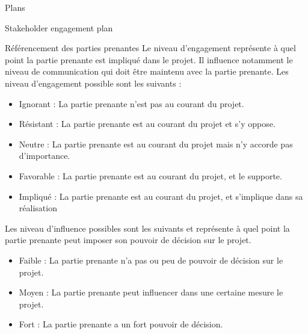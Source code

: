 \documentclass[]{article}
\begin{document}
\begin{section}{Plans}
\begin{subsection}{Stakeholder engagement plan}
\begin{subsubsection}{Référencement des parties prenantes}
         Le niveau d'engagement représente à quel point la partie prenante est impliqué dans le projet. Il influence notamment le niveau de communication qui doit être maintenu avec la partie prenante.
         Les niveau d'engagement possible sont les suivants :
         \begin{itemize}
             \item Ignorant : La partie prenante n'est pas au courant du projet.
             \item Résistant : La partie prenante est au courant du projet et s'y oppose.
             \item Neutre : La partie prenante est au courant du projet mais n'y accorde pas d'importance.
             \item Favorable : La partie prenante est au courant du projet, et le supporte.
             \item Impliqué : La partie prenante est au courant du projet, et s'implique dans sa réalisation
         \end{itemize}

         Les niveau d'influence possibles sont les suivants et représente à quel point la partie prenante peut imposer son pouvoir de décision sur le projet.
         \begin{itemize}
             \item Faible : La partie prenante n'a pas ou peu de pouvoir de décision sur le projet.
             \item Moyen : La partie prenante peut influencer dans une certaine mesure le projet.
             \item Fort : La partie prenante a un fort pouvoir de décision.
         \end{itemize}

     \end{subsubsection}
 \end{subsection}


\end{section}
\end{document}
